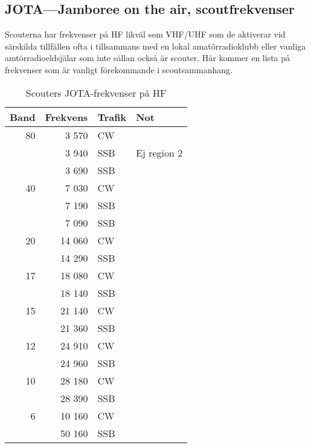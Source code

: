 \subsection{JOTA---Jamboree on the air, scoutfrekvenser}

Scouterna har frekvenser på HF likväl som VHF/UHF som de aktiverar vid särskilda
tillfällen ofta i tillsammans med en lokal amatörradioklubb eller vanliga
amtörradioeldsjälar som inte sällan också är scouter. Här kommer en lista på
frekvenser som är vanligt förekommande i scoutsammanhang.

\begin{table}[H]
\centering
\begin{tabular}{rrll}
	\textbf{Band} & \textbf{Frekvens} & \textbf{Trafik} & \textbf{Not} \\ \hline

               80 & 3 570  & CW  &             \\
	              & 3 940  & SSB & Ej region 2 \\
	              & 3 690  & SSB &             \\ \hline
	           40 & 7 030  & CW  &             \\
	              & 7 190  & SSB &             \\
	              & 7 090  & SSB &             \\ \hline
	           20 & 14 060 & CW  &             \\
	              & 14 290 & SSB &             \\ \hline
	           17 & 18 080 & CW  &             \\
	              & 18 140 & SSB &             \\ \hline
	           15 & 21 140 & CW  &             \\
	              & 21 360 & SSB &             \\ \hline
	           12 & 24 910 & CW  &             \\
	              & 24 960 & SSB &             \\ \hline
	           10 & 28 180 & CW  &             \\
	              & 28 390 & SSB &             \\ \hline
	            6 & 10 160 & CW  &             \\
	              & 50 160 & SSB &             \\ \hline
\end{tabular}
\caption{Scouters JOTA-frekvenser på HF}
\end{table}

